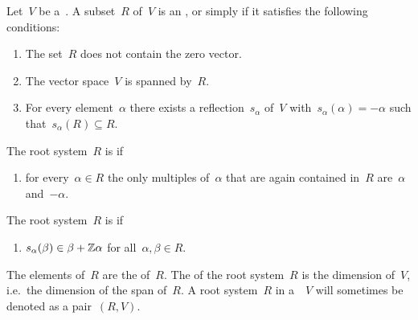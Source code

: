 \begin{definition}
  Let~$V$ be a~{\vectorspace{$\kf$}}.
  A subset~$R$ of~$V$ is an , or simply  if it satisfies the following conditions:
  \begin{enumerate}[label = (R\arabic*), start=0]
    \item
      \label{does not contain zero}
      The set~$R$ does not contain the zero vector.
    \item
      \label{root system spans}
      The vector space~$V$ is spanned by~$R$.
    \item
      \label{closed under reflections}
      For every element~$\alpha$ there exists a reflection~$s_\alpha$ of~$V$ with~$s_\alpha(\alpha) = -\alpha$ such that~$s_\alpha(R) \subseteq R$.
  \end{enumerate}
  The root system~$R$ is  if
  \begin{enumerate}[label = (R\arabic*), resume]
    \item
      for every~$\alpha \in R$ the only multiples of~$\alpha$ that are again contained in~$R$ are~$\alpha$ and~$-\alpha$.
  \end{enumerate}
  The root system~$R$ is  if
  \begin{enumerate}[label = (R\arabic*), resume]
    \item
      $s_\alpha(\beta) \in \beta + \mathbb{Z} \alpha$ for all~$\alpha, \beta \in R$.
  \end{enumerate}
  The elements of~$R$ are the  of~$R$.
  The  of the root system~$R$ is the dimension of~$V$, i.e.\ the dimension of the span of~$R$.
  A root system~$R$ in a~{\vectorspace{$\kf$}}~$V$ will sometimes be denoted as a pair~$(R, V)$.
\end{definition}


